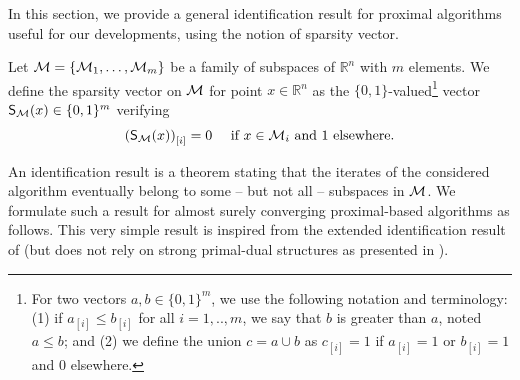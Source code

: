 In this section, we provide a general identification result for proximal algorithms useful for our developments, using the notion of sparsity vector.

\begin{definition}\label{def:sparsity}
Let $\M= \{ \M_1,\ldots,\M_m\}$ be a family of subspaces of $\mathbb{R}^n$ with $m$ elements. We define the {sparsity vector} on $\M$ for point $x\in\mathbb{R}^n$ as the $\{0,1\}$-valued\footnote{For two vectors $a,b\in\{0,1\}^m$, we use the following notation and terminology: (1) if  $a_{[i]} \leq b_{[i]}$ for all $i=1,..,m$, we say that $b$ is greater than $a$, noted $a\leq b$; and (2) we define the union $c = a\cup b$ as $c_{[i]} = 1 $ if $a_{[i]} = 1$ or $b_{[i]}=1$ and $0$ elsewhere.} vector  $\S(x)\in \{0,1\}^m$ verifying
\begin{align}\label{eq:strata}
    \left( \S(x) \right)_{[i]} = 0 \quad\text{ if } x \in \M_i \text{ and } 1 \text{ elsewhere}.
\end{align}
\end{definition}

An identification result is a theorem stating that the iterates of the considered algorithm eventually belong to some -- but not all -- subspaces in $\M$. We formulate such a result for almost surely converging proximal-based algorithms as follows. This very simple result is inspired from the extended identification result of \cite{fadili2018sensitivity} (but does not rely on strong primal-dual structures as presented in \cite{fadili2018sensitivity}).

